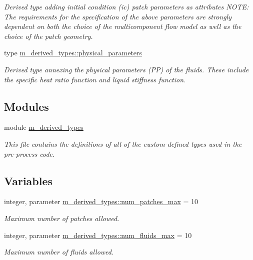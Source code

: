 \begin{DoxyCompactItemize}
\begin{DoxyCompactList}\small\item\em Derived type adding initial condition (ic) patch parameters as attributes N\+O\+TE\+: The requirements for the specification of the above parameters are strongly dependent on both the choice of the multicomponent flow model as well as the choice of the patch geometry. \end{DoxyCompactList}\item 
type \hyperlink{structm__derived__types_1_1physical__parameters}{m\+\_\+derived\+\_\+types\+::physical\+\_\+parameters}
\begin{DoxyCompactList}\small\item\em Derived type annexing the physical parameters (PP) of the fluids. These include the specific heat ratio function and liquid stiffness function. \end{DoxyCompactList}\end{DoxyCompactItemize}
\subsection*{Modules}
\begin{DoxyCompactItemize}
\item 
module \hyperlink{namespacem__derived__types}{m\+\_\+derived\+\_\+types}
\begin{DoxyCompactList}\small\item\em This file contains the definitions of all of the custom-\/defined types used in the pre-\/process code. \end{DoxyCompactList}\end{DoxyCompactItemize}
\subsection*{Variables}
\begin{DoxyCompactItemize}
\item 
integer, parameter \hyperlink{namespacem__derived__types_a0e61503f10c4338737b8d61e9109e396}{m\+\_\+derived\+\_\+types\+::num\+\_\+patches\+\_\+max} = 10
\begin{DoxyCompactList}\small\item\em Maximum number of patches allowed. \end{DoxyCompactList}\item 
integer, parameter \hyperlink{namespacem__derived__types_a3dde07670ef3e164534aa68c1830ff62}{m\+\_\+derived\+\_\+types\+::num\+\_\+fluids\+\_\+max} = 10
\begin{DoxyCompactList}\small\item\em Maximum number of fluids allowed. \end{DoxyCompactList}\end{DoxyCompactItemize}


